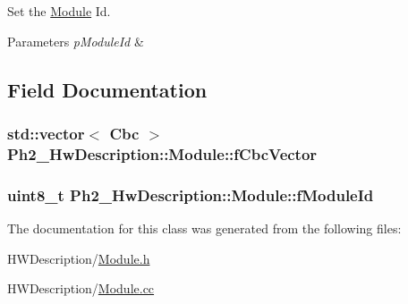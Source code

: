 Set the \hyperlink{class_ph2___hw_description_1_1_module}{Module} Id. 


\begin{DoxyParams}{Parameters}
{\em p\-Module\-Id} & \\
\hline
\end{DoxyParams}


\subsection{Field Documentation}
\hypertarget{class_ph2___hw_description_1_1_module_ab5cfd93bf927592f609d31f66cd4161b}{
\subsubsection[{f\-Cbc\-Vector}]{\setlength{\rightskip}{0pt plus 5cm}std\-::vector$<$ {\bf Cbc} $>$ Ph2\-\_\-\-Hw\-Description\-::\-Module\-::f\-Cbc\-Vector\hspace{0.3cm}{\ttfamily [protected]}}}\label{class_ph2___hw_description_1_1_module_ab5cfd93bf927592f609d31f66cd4161b}
\hypertarget{class_ph2___hw_description_1_1_module_a8bf42ae708d304acbc5509edf7f7cee0}{
\subsubsection[{f\-Module\-Id}]{\setlength{\rightskip}{0pt plus 5cm}uint8\-\_\-t Ph2\-\_\-\-Hw\-Description\-::\-Module\-::f\-Module\-Id\hspace{0.3cm}{\ttfamily [protected]}}}\label{class_ph2___hw_description_1_1_module_a8bf42ae708d304acbc5509edf7f7cee0}


The documentation for this class was generated from the following files\-:\begin{DoxyCompactItemize}
\item 
H\-W\-Description/\hyperlink{_module_8h}{Module.\-h}\item 
H\-W\-Description/\hyperlink{_module_8cc}{Module.\-cc}\end{DoxyCompactItemize}
